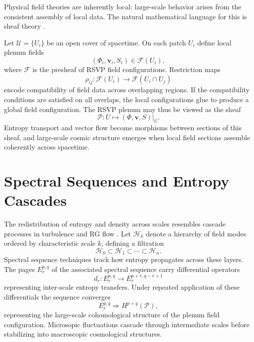 \documentclass[12pt,a4paper]{article}
\theoremstyle{plain}
\theoremstyle{definition}
\theoremstyle{remark}
\begin{document}
Physical field theories are inherently local: large-scale behavior
arises from the consistent assembly of local data. The natural
mathematical language for this is sheaf theory
\cite{CostelloGwilliam,LurieTFT}.

Let $\mathcal{U} = \{U_i\}$ be an open cover of spacetime. On each
patch $U_i$ define local plenum fields
\begin{equation}
(\Phi_i,\mathbf{v}_i,S_i) \in \mathcal{F}(U_i),
\end{equation}
where $\mathcal{F}$ is the presheaf of RSVP field configurations.
Restriction maps
\begin{equation}
\rho_{ij} : \mathcal{F}(U_i) \rightarrow \mathcal{F}(U_i \cap U_j)
\end{equation}
encode compatibility of field data across overlapping regions. If the
compatibility conditions are satisfied on all overlaps, the local
configurations glue to produce a global field configuration. The RSVP
plenum may thus be viewed as the sheaf
\begin{equation}
\mathcal{P} : U \mapsto (\Phi,\mathbf{v},S)|_U.
\end{equation}
Entropy transport and vector flow become morphisms between sections of
this sheaf, and large-scale cosmic structure emerges when local field
sections assemble coherently across spacetime.

\section{Spectral Sequences and Entropy Cascades}

The redistribution of entropy and density across scales resembles
cascade processes in turbulence and RG flow
\cite{Onsager1949,Wilson1975}. Let $\mathcal{H}_k$ denote a hierarchy
of field modes ordered by characteristic scale $k$, defining a
filtration
\begin{equation}
\mathcal{H}_0 \subset \mathcal{H}_1 \subset \cdots \subset \mathcal{H}_n.
\end{equation}
Spectral sequence techniques track how entropy propagates across these
layers. The pages $E_r^{p,q}$ of the associated spectral sequence
carry differential operators
\begin{equation}
d_r : E_r^{p,q} \rightarrow E_r^{p+r,q-r+1}
\end{equation}
representing inter-scale entropy transfers. Under repeated application
of these differentials the sequence converges
\begin{equation}
E_r^{p,q} \Rightarrow H^{p+q}(\mathcal{P}),
\end{equation}
representing the large-scale cohomological structure of the plenum
field configuration. Microsopic fluctuations cascade through
intermediate scales before stabilizing into macroscopic cosmological
structures.
\end{document}
